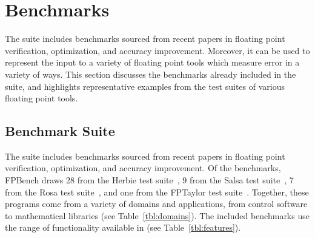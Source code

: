 \documentclass[main.tex]{subfiles}
\begin{document}
\section{Benchmarks}
\label{sec:case-studies}

The \name suite includes \nbenches benchmarks
  sourced from recent papers in floating point verification,
  optimization, and accuracy improvement.
Moreover, it can be used to represent the input
  to a variety of floating point tools
  which measure error in a variety of ways.
This section discusses the benchmarks
  already included in the \name suite,
  and highlights representative examples
  from the test suites of various floating point tools.

\subsection{Benchmark Suite}

The \name suite includes \nbenches benchmarks
  sourced from recent papers in floating point verification,
  optimization, and accuracy improvement.
Of the benchmarks,
  FPBench draws 28 from the Herbie test suite~\cite{pavel15},
  9 from the Salsa test suite~\cite{fmics15},
  7 from the Rosa test suite~\cite{DarulovaK14},
  and one from the FPTaylor test suite~\cite{fptaylor-fm15}.
Together, these programs come from
  a variety of domains and applications,
  from control software to mathematical libraries
  (see Table~\ref{tbl:domains}).
The included benchmarks use the range of functionality
  available in \name (see Table~\ref{tbl:features}).
\end{document}
